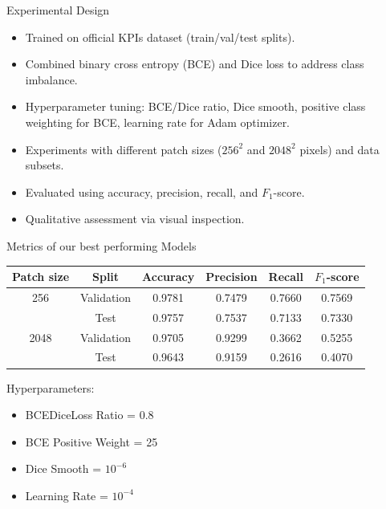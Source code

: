\documentclass{beamer}
\begin{document}
\begin{frame}{Experimental Design}
    \begin{itemize}
        \item Trained on official KPIs dataset (train/val/test splits).
        \item Combined binary cross entropy (BCE) and Dice loss to address class imbalance. 
        \item Hyperparameter tuning: BCE/Dice ratio, Dice smooth, positive class weighting for BCE, learning rate for Adam optimizer.
        \item Experiments with different patch sizes ($256^2$ and $2048^2$ pixels) and data subsets.
        \item Evaluated using accuracy, precision, recall, and $F_1$-score.
        \item Qualitative assessment via visual inspection.
    \end{itemize}
\end{frame}

\begin{frame}{Metrics of our best performing Models}
    \begin{table}[t]
        \centering
        \begin{tabular}{c|c|cccc}
            \toprule
            Patch size & Split & Accuracy & Precision & Recall & $F_1$-score \\
            \midrule
            256 & Validation & 0.9781 & 0.7479 & 0.7660 & 0.7569 \\
            & Test       & 0.9757 & 0.7537 & 0.7133 & 0.7330 \\
            \midrule
            2048 & Validation & 0.9705 & 0.9299 & 0.3662 & 0.5255 \\
            & Test       & 0.9643 & 0.9159 & 0.2616 & 0.4070 \\
            \bottomrule
        \end{tabular}
    \end{table}
    \begin{block}{Hyperparameters:}
        \begin{itemize}
            \item BCEDiceLoss Ratio = 0.8
            \item BCE Positive Weight = 25
            \item Dice Smooth = $10^{-6}$
            \item Learning Rate = $10^{-4}$
        \end{itemize}
    \end{block}
\end{frame}
\end{document}
